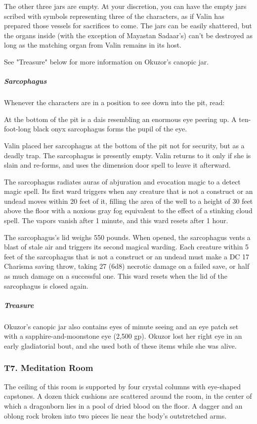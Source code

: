 \documentclass[10pt,a4paper,twoside,bg=print,twocolumn,openany,nodeprecatedcode]{dndbook}
\begin{document}
The other three jars are empty. At your discretion, you can have the empty jars scribed with symbols representing three of the characters, as if Valin has prepared those vessels for sacrifices to come. The jars can be easily shattered, but the organs inside (with the exception of Mayastan Sadaar's) can't be destroyed as long as the matching organ from Valin remains in its host.

See "Treasure" below for more information on Okuzor's canopic jar.

\subparagraph{Sarcophagus}
Whenever the characters are in a position to see down into the pit, read:

\begin{DndReadAloud}{}
At the bottom of the pit is a dais resembling an enormous eye peering up. A ten-foot-long black onyx sarcophagus forms the pupil of the eye.

\end{DndReadAloud}

Valin placed her sarcophagus at the bottom of the pit not for security, but as a deadly trap. The sarcophagus is presently empty. Valin returns to it only if she is slain and re-forms, and uses the dimension door spell to leave it afterward.

The sarcophagus radiates auras of abjuration and evocation magic to a detect magic spell. Its first ward triggers when any creature that is not a construct or an undead moves within 20 feet of it, filling the area of the well to a height of 30 feet above the floor with a noxious gray fog equivalent to the effect of a stinking cloud spell. The vapors vanish after 1 minute, and this ward resets after 1 hour.

The sarcophagus's lid weighs 550 pounds. When opened, the sarcophagus vents a blast of stale air and triggers its second magical warding. Each creature within 5 feet of the sarcophagus that is not a construct or an undead must make a DC 17 Charisma saving throw, taking 27 (6d8) necrotic damage on a failed save, or half as much damage on a successful one. This ward resets when the lid of the sarcophagus is closed again.

\subparagraph{Treasure}
Okuzor's canopic jar also contains eyes of minute seeing and an eye patch set with a sapphire-and-moonstone eye (2,500 gp). Okuzor lost her right eye in an early gladiatorial bout, and she used both of these items while she was alive.

\subsubsection{T7. Meditation Room}
\begin{DndReadAloud}{}
The ceiling of this room is supported by four crystal columns with eye-shaped capstones. A dozen thick cushions are scattered around the room, in the center of which a dragonborn lies in a pool of dried blood on the floor. A dagger and an oblong rock broken into two pieces lie near the body's outstretched arms.

\end{DndReadAloud}
\end{document}
